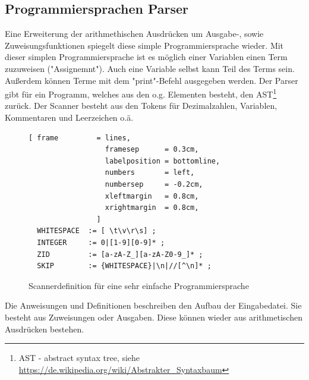 \subsection{Programmiersprachen Parser}
Eine Erweiterung der arithmethischen Ausdrücken um Ausgabe-, sowie Zuweisungsfunktionen spiegelt diese simple Programmiersprache wieder. Mit dieser simplen Programmiersprache ist es möglich einer Variablen einen Term zuzuweisen ("Assignemnt"). Auch eine Variable selbst kann Teil des Terms sein. Außerdem können Terme mit dem "print"-Befehl ausgegeben werden.
Der Parser gibt für ein Programm, welches aus den o.g. Elementen besteht, den AST\footnote{AST - abstract syntax tree, siehe \url{https://de.wikipedia.org/wiki/Abstrakter_Syntaxbaum}} zurück.
Der Scanner  besteht aus den Tokens für Dezimalzahlen, Variablen, Kommentaren und Leerzeichen o.ä.
\begin{figure}[!htb]
\begin{Verbatim}[ frame         = lines, 
                  framesep      = 0.3cm, 
                  labelposition = bottomline,
                  numbers       = left,
                  numbersep     = -0.2cm,
                  xleftmargin   = 0.8cm,
                  xrightmargin  = 0.8cm,
                ]
  WHITESPACE  := [ \t\v\r\s] ;
  INTEGER     := 0|[1-9][0-9]* ;
  ZID         := [a-zA-Z_][a-zA-Z0-9_]* ;
  SKIP        := {WHITESPACE}|\n|//[^\n]* ;
\end{Verbatim}
\caption{Scannerdefinition für eine sehr einfache Programmiersprache}
\label{fig:example_interpreter_grammar_scanner}
\end{figure}
Die Anweisungen und Definitionen  beschreiben den Aufbau der Eingabedatei. Sie besteht aus Zuweisungen oder Ausgaben. Diese können wieder aus arithmetischen Ausdrücken bestehen.
